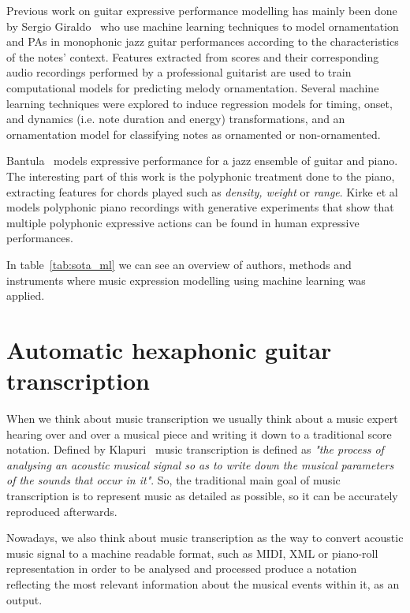 Previous work on guitar expressive performance modelling has mainly been done by Sergio Giraldo~\cite{Giraldo2016} who use machine learning techniques to model ornamentation and PAs in monophonic jazz guitar performances according to the characteristics of the notes' context. Features extracted from scores and their corresponding audio recordings performed by a professional guitarist are used to train computational models for predicting melody ornamentation. Several machine learning techniques were explored to induce regression models for timing, onset, and dynamics (i.e. note duration and energy) transformations, and an ornamentation model for classifying notes as ornamented or non-ornamented.

Bantula~\cite{bantula2016} models expressive performance for a jazz ensemble of guitar and piano. The interesting part of this work is the polyphonic treatment done to the piano, extracting features for chords played such as \textit{density, weight} or \textit{range}. Kirke et al~\cite{KirkeAlexisMiranda2013} models polyphonic piano recordings with generative experiments that show that multiple polyphonic expressive actions can be found in human expressive performances. 

In table~\ref{tab:sota_ml} we can see an overview of authors, methods and instruments where music expression modelling using machine learning was applied.



\section{Automatic hexaphonic guitar transcription}
\label{sec:autohexaguit}
When we think about music transcription we usually think about a music expert hearing over and over a musical piece and writing it down to a traditional score notation. Defined by Klapuri~\cite{Klapuri2004} music transcription is defined as \textit{"the process of analysing an acoustic musical signal so as to write down the musical parameters of the sounds that occur in it"}. So, the traditional main goal of music transcription is to represent music as detailed as possible, so it can be accurately reproduced afterwards. 

Nowadays, we also think about music transcription as the way to convert acoustic music signal to a machine readable format, such as MIDI, XML or piano-roll representation in order to be analysed and processed produce a notation reflecting the most relevant information about the musical events within it, as an output. 	


